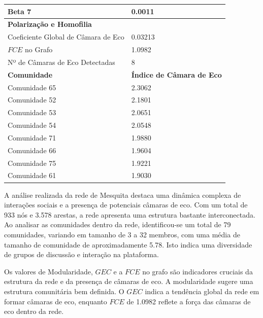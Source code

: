 \begin{table}[ht]
\begin{tabular}{l|l}
		Beta 7                              & 0.0011                           \\
		\midrule
		\textbf{Polarização e Homofilia}    &                                  \\
		\midrule
		Coeficiente Global de Câmara de Eco & 0.03213                          \\
		$FCE$ no Grafo                      & 1.0982                           \\
		Nº de Câmaras de Eco Detectadas     & 8                                \\
		\midrule
		\textbf{Comunidade}                 & \textbf{Índice de Câmara de Eco} \\
		\midrule
		Comunidade 65                       & 2.3062                           \\
		Comunidade 52                       & 2.1801                           \\
		Comunidade 53                       & 2.0651                           \\
		Comunidade 54                       & 2.0548                           \\
		Comunidade 71                       & 1.9880                           \\
		Comunidade 66                       & 1.9604                           \\
		Comunidade 75                       & 1.9221                           \\
		Comunidade 61                       & 1.9030                           \\
		\bottomrule
	\end{tabular}
\end{table}

A análise realizada da rede de Mesquita destaca uma dinâmica complexa de interações sociais e a presença de potenciais câmaras de eco. Com um total de 933 nós e 3.578 arestas, a rede apresenta uma estrutura bastante interconectada. Ao analisar as comunidades dentro da rede, identificou-se um total de 79 comunidades, variando em tamanho de 3 a 32 membros, com uma média de tamanho de comunidade de aproximadamente 5.78. Isto indica uma diversidade de grupos de discussão e interação na plataforma.

Os valores de Modularidade, $GEC$ e a $FCE$ no grafo são indicadores cruciais da estrutura da rede e da presença de câmaras de eco. A modularidade sugere uma estrutura comunitária bem definida. O $GEC$ indica a tendência global da rede em formar câmaras de eco, enquanto $FCE$ de 1.0982 reflete a força das câmaras de eco dentro da rede.

